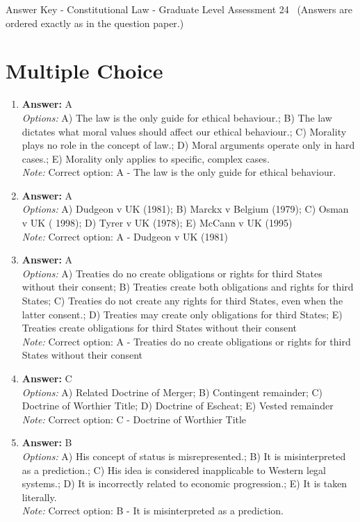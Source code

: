 \documentclass[12pt]{article}
\begin{document}
\begin{center}
Answer Key - Constitutional Law - Graduate Level Assessment 24 \
\small (Answers are ordered exactly as in the question paper.)
\end{center}

\section*{Multiple Choice}
\begin{enumerate}[label=\arabic*.]
\item \textbf{Answer:} A
\\ \textit{Options:} A) The law is the only guide for ethical behaviour.; B) The law dictates what moral values should affect our ethical behaviour.; C) Morality plays no role in the concept of law.; D) Moral arguments operate only in hard cases.; E) Morality only applies to specific, complex cases.
\\ \textit{Note:} Correct option: A - The law is the only guide for ethical behaviour.
\item \textbf{Answer:} A
\\ \textit{Options:} A) Dudgeon v UK (1981); B) Marckx v Belgium (1979); C) Osman v UK ( 1998); D) Tyrer v UK (1978); E) McCann v UK (1995)
\\ \textit{Note:} Correct option: A - Dudgeon v UK (1981)
\item \textbf{Answer:} A
\\ \textit{Options:} A) Treaties do no create obligations or rights for third States without their consent; B) Treaties create both obligations and rights for third States; C) Treaties do not create any rights for third States, even when the latter consent.; D) Treaties may create only obligations for third States; E) Treaties create obligations for third States without their consent
\\ \textit{Note:} Correct option: A - Treaties do no create obligations or rights for third States without their consent
\item \textbf{Answer:} C
\\ \textit{Options:} A) Related Doctrine of Merger; B) Contingent remainder; C) Doctrine of Worthier Title; D) Doctrine of Escheat; E) Vested remainder
\\ \textit{Note:} Correct option: C - Doctrine of Worthier Title
\item \textbf{Answer:} B
\\ \textit{Options:} A) His concept of status is misrepresented.; B) It is misinterpreted as a prediction.; C) His idea is considered inapplicable to Western legal systems.; D) It is incorrectly related to economic progression.; E) It is taken literally.
\\ \textit{Note:} Correct option: B - It is misinterpreted as a prediction.
\end{enumerate}
\end{document}
